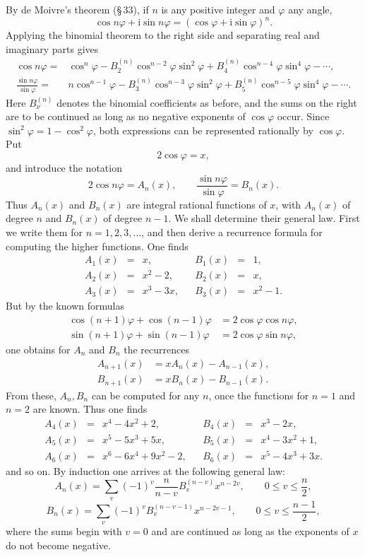 \documentclass[11pt]{article}
\providecommand{\ii}{\mathrm{i}}
\begin{document}
By de Moivre's theorem (\S\,33), if $n$ is any positive integer and $\varphi$ any angle,
\[
\tag{1}        \cos n\varphi+\ii\sin n\varphi=(\cos\varphi+\ii\sin\varphi)^n.
\]
Applying the binomial theorem to the right side and separating real and imaginary parts gives
\[
\tag{2}\begin{aligned}
\cos n\varphi={}&\cos^n\varphi-B_2^{(n)}\cos^{n-2}\varphi\sin^2\varphi
+B_4^{(n)}\cos^{n-4}\varphi\sin^4\varphi-\cdots,\\
\frac{\sin n\varphi}{\sin\varphi}={}&n\cos^{n-1}\varphi
-B_3^{(n)}\cos^{n-3}\varphi\sin^2\varphi
+B_5^{(n)}\cos^{n-5}\varphi\sin^4\varphi-\cdots.
\end{aligned}
\]
Here $B_\nu^{(n)}$ denotes the binomial coefficients as before, and the sums on the right are to be continued as long as no negative exponents of $\cos\varphi$ occur. Since $\sin^2\varphi=1-\cos^2\varphi$, both expressions can be represented rationally by $\cos\varphi$. Put
\[
\tag{3}        2\cos\varphi=x,
\]
and introduce the notation
\[
\tag{4}        2\cos n\varphi=A_n(x),\qquad
        \frac{\sin n\varphi}{\sin\varphi}=B_n(x).
\]
Thus $A_n(x)$ and $B_n(x)$ are integral rational functions of $x$, with $A_n(x)$ of degree $n$ and $B_n(x)$ of degree $n-1$. We shall determine their general law. First we write them for $n=1,2,3,\ldots$, and then derive a recurrence formula for computing the higher functions. One finds
\[
\tag{5}\begin{array}{rclcrcl}
A_1(x)&=&x,       && B_1(x)&=&1,\\
A_2(x)&=&x^2-2,   && B_2(x)&=&x,\\
A_3(x)&=&x^3-3x,  && B_3(x)&=&x^2-1.
\end{array}
\]
But by the known formulas
\[
\begin{aligned}
\cos(n+1)\varphi+\cos(n-1)\varphi&=2\cos\varphi\cos n\varphi,\\
\sin(n+1)\varphi+\sin(n-1)\varphi&=2\cos\varphi\sin n\varphi,
\end{aligned}
\]
one obtains for $A_n$ and $B_n$ the recurrences
\[
\tag{6}\begin{aligned}
A_{n+1}(x)&=xA_n(x)-A_{n-1}(x),\\
B_{n+1}(x)&=xB_n(x)-B_{n-1}(x).
\end{aligned}
\]
From these, $A_n,B_n$ can be computed for any $n$, once the functions for $n=1$ and $n=2$ are known. Thus one finds
\[
\begin{array}{rclcrcl}
A_4(x)&=&x^4-4x^2+2,     && B_4(x)&=&x^3-2x,\\
A_5(x)&=&x^5-5x^3+5x,   && B_5(x)&=&x^4-3x^2+1,\\
A_6(x)&=&x^6-6x^4+9x^2-2, && B_6(x)&=&x^5-4x^3+3x.
\end{array}
\]
and so on. By induction one arrives at the following general law:
\[
\tag{7}        A_n(x)=\sum_v(-1)^v\frac{n}{n-v}B_v^{(n-v)}x^{n-2v},
        \qquad 0\le v\le \frac n2,
\]
\[
\tag{8}        B_n(x)=\sum_v(-1)^vB_v^{(n-v-1)}x^{n-2v-1},
        \qquad 0\le v\le\frac{n-1}{2},
\]
where the sums begin with $v=0$ and are continued as long as the exponents of $x$ do not become negative.
\end{document}
